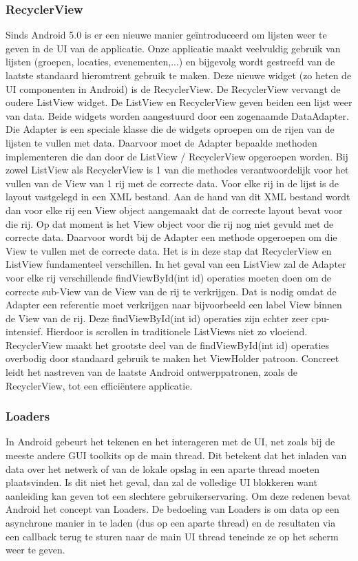 \subsubsection{RecyclerView}
Sinds Android 5.0 is er een nieuwe manier geïntroduceerd om lijsten weer te geven in de UI van de applicatie. Onze applicatie maakt veelvuldig gebruik van lijsten (groepen, locaties, evenementen,...) en bijgevolg wordt gestreefd van de laatste standaard hieromtrent gebruik te maken. Deze nieuwe widget (zo heten de UI componenten in Android) is de RecyclerView. De RecyclerView vervangt de oudere ListView widget.
De ListView en RecyclerView geven beiden een lijst weer van data. Beide widgets worden aangestuurd door een zogenaamde DataAdapter. Die Adapter is een speciale klasse die de widgets oproepen om de rijen van de lijsten te vullen met data. Daarvoor moet de Adapter bepaalde methoden implementeren die dan door de ListView / RecyclerView opgeroepen worden. Bij zowel ListView als RecyclerView is 1 van die methodes verantwoordelijk voor het vullen van de View van 1 rij met de correcte data.
Voor elke rij in de lijst is de layout vastgelegd in een XML bestand. Aan de hand van dit XML bestand wordt dan voor elke rij een View object aangemaakt dat de correcte layout bevat voor die rij. Op dat moment is het View object voor die rij nog niet gevuld met de correcte data. Daarvoor wordt bij de Adapter een methode opgeroepen om die View te vullen met de correcte data.
Het is in deze stap dat RecyclerView en ListView fundamenteel verschillen. In het geval van een ListView zal de Adapter voor elke rij verschillende findViewById(int id) operaties moeten doen om de correcte sub-View van de View van de rij te verkrijgen. Dat is nodig omdat de Adapter een referentie moet verkrijgen naar bijvoorbeeld een label View binnen de View van de rij. Deze findViewById(int id) operaties zijn echter zeer cpu-intensief. Hierdoor is scrollen in traditionele ListViews niet zo vloeiend.
RecyclerView maakt het grootste deel van de findViewById(int id) operaties overbodig door standaard gebruik te maken het ViewHolder patroon.
Concreet leidt het nastreven van de laatste Android ontwerppatronen, zoals de RecyclerView, tot een efficiëntere applicatie.

\subsubsection{Loaders}
In Android gebeurt het tekenen en het interageren met de UI, net zoals bij de meeste andere GUI toolkits op de main thread. Dit betekent dat het inladen van data over het netwerk of van de lokale opslag in een aparte thread moeten plaatsvinden. Is dit niet het geval, dan zal de volledige UI blokkeren want aanleiding kan geven tot een slechtere gebruikerservaring.
Om deze redenen bevat Android het concept van Loaders. De bedoeling van Loaders is om data op een asynchrone manier in te laden (dus op een aparte thread) en de resultaten via een callback terug te sturen naar de main UI thread teneinde ze op het scherm weer te geven. 
\newline\newline


